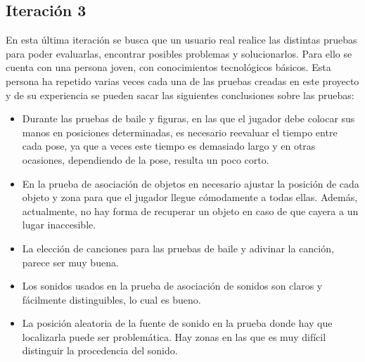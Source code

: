 
\subsection{Iteración 3}


En esta última iteración se busca que un usuario real realice las distintas pruebas para poder evaluarlas, encontrar posibles problemas y solucionarlos. Para ello se cuenta con una persona joven, con conocimientos tecnológicos básicos. Esta persona ha repetido varias veces cada una de las pruebas creadas en este proyecto y de su experiencia se pueden sacar las siguientes conclusiones sobre las pruebas:


\begin{itemize}
    \item {Durante las pruebas de baile y figuras, en las que el jugador debe colocar sus manos en posiciones determinadas, es necesario reevaluar el tiempo entre cada pose, ya que a veces este tiempo es demasiado largo y en otras ocasiones, dependiendo de la pose, resulta un poco corto.}
    \item {En la prueba de asociación de objetos en necesario ajustar la posición de cada objeto y zona para que el jugador llegue cómodamente a todas ellas. Además, actualmente, no hay forma de recuperar un objeto en caso de que cayera a un lugar inaccesible.}
    \item{La elección de canciones para las pruebas de baile y adivinar la canción, parece ser muy buena.}
    \item{Los sonidos usados en la prueba de asociación de sonidos son claros y fácilmente distinguibles, lo cual es bueno.}
    \item{La posición aleatoria de la fuente de sonido en la prueba donde hay que localizarla puede ser problemática. Hay zonas en las que es muy difícil distinguir la procedencia del sonido.}
\end{itemize}


